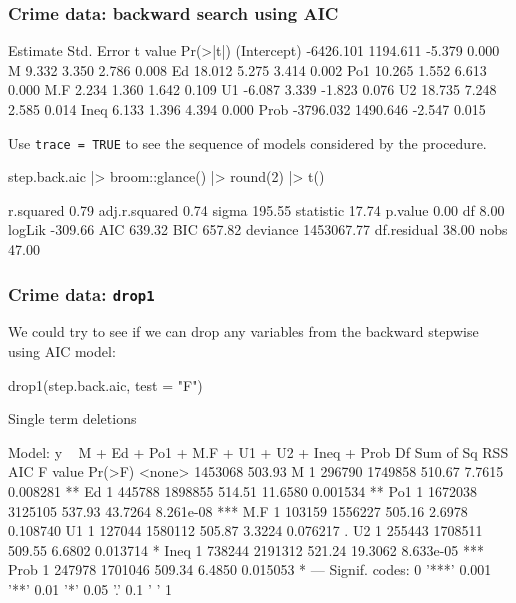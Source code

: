 \documentclass[a4paper]{article}
\begin{document}
\subsubsection{Crime data: backward search using AIC}
\begin{Schunk}
\begin{Soutput}
             Estimate Std. Error t value Pr(>|t|)
(Intercept) -6426.101   1194.611  -5.379    0.000
M               9.332      3.350   2.786    0.008
Ed             18.012      5.275   3.414    0.002
Po1            10.265      1.552   6.613    0.000
M.F             2.234      1.360   1.642    0.109
U1             -6.087      3.339  -1.823    0.076
U2             18.735      7.248   2.585    0.014
Ineq            6.133      1.396   4.394    0.000
Prob        -3796.032   1490.646  -2.547    0.015
\end{Soutput}
\end{Schunk}
Use \lstinline|trace = TRUE| to see the sequence of models considered by the procedure.
\begin{Schunk}
\begin{Sinput}
step.back.aic |>
  broom::glance() |> 
  round(2) |> t()
\end{Sinput}
\begin{Soutput}
                    [,1]
r.squared           0.79
adj.r.squared       0.74
sigma             195.55
statistic          17.74
p.value             0.00
df                  8.00
logLik           -309.66
AIC               639.32
BIC               657.82
deviance      1453067.77
df.residual        38.00
nobs               47.00
\end{Soutput}
\end{Schunk}
\subsubsection{Crime data: \lstinline|drop1|}
We could try to see if we can drop any variables from the backward stepwise using AIC model:
\begin{Schunk}
\begin{Sinput}
drop1(step.back.aic, test = "F")
\end{Sinput}
\begin{Soutput}
Single term deletions

Model:
y ~ M + Ed + Po1 + M.F + U1 + U2 + Ineq + Prob
       Df Sum of Sq     RSS    AIC F value    Pr(>F)    
<none>              1453068 503.93                      
M       1    296790 1749858 510.67  7.7615  0.008281 ** 
Ed      1    445788 1898855 514.51 11.6580  0.001534 ** 
Po1     1   1672038 3125105 537.93 43.7264 8.261e-08 ***
M.F     1    103159 1556227 505.16  2.6978  0.108740    
U1      1    127044 1580112 505.87  3.3224  0.076217 .  
U2      1    255443 1708511 509.55  6.6802  0.013714 *  
Ineq    1    738244 2191312 521.24 19.3062 8.633e-05 ***
Prob    1    247978 1701046 509.34  6.4850  0.015053 *  
---
Signif. codes:  0 '***' 0.001 '**' 0.01 '*' 0.05 '.' 0.1 ' ' 1
\end{Soutput}
\end{Schunk}
\end{document}

